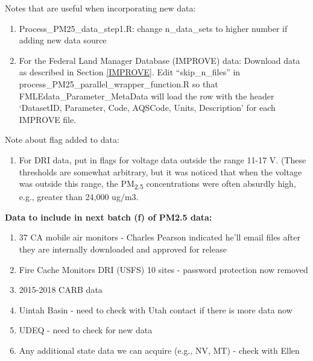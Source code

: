 \begin{enumerate}[nolistsep]
\medskip
Notes that are useful when incorporating new data:
\begin{enumerate}
\item Process\_PM25\_data\_step1.R: change n\_data\_sets to higher number if adding new data source
\item For the Federal Land Manager Database (IMPROVE) data: Download data as described in Section \ref{IMPROVE}. Edit ``skip\_n\_files'' in process\_PM25\_parallel\_wrapper\_function.R so that FMLEdata\_Parameter\_MetaData will load the row with the header `DatasetID, Parameter, Code, AQSCode, Units, Description' for each IMPROVE file.
\end{enumerate}

Note about flag added to data:

	\begin{enumerate}
	\item For DRI data, put in flags for voltage data outside the range 11-17 V. (These thresholds are somewhat arbitrary, but it was noticed that when the voltage was outside this range, the PM\textsubscript{2.5} concentrations were often absurdly high, e.g., greater than 24,000 ug/m3.
	\end{enumerate}

\textbf{Data to include in next batch (f) of PM2.5 data:}

\begin{enumerate}
\item 37 CA mobile air monitors - Charles Pearson indicated he’ll email files after they are internally downloaded and approved for release
\item Fire Cache Monitors DRI (USFS) 10 sites - password protection now removed
\item 2015-2018 CARB data
\item Uintah Basin - need to check with Utah contact if there is more data now
\item UDEQ - need to check for new data
\item Any additional state data we can acquire (e.g., NV, MT) - check with Ellen
\end{enumerate}


\end{enumerate}
